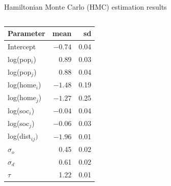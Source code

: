\documentclass{beamer}
\begin{document}
\begin{frame}{Hamiltonian Monte Carlo (HMC) estimation results}
		\begin{columns}
		\begin{column}{0.5\textwidth}
			\begin{center}
				\begin{small}
			  \begin{tabular}{lrr}
				\toprule
				Parameter & mean & sd \\ 
				\midrule
				Intercept      & $-0.74$ & 0.04 \\ 
				log(pop$_i$)   & 0.89 & 0.03  \\ 
				log(pop$_j$)   & 0.88 & 0.04  \\ 
				log(home$_i$)  & $-1.48$ & 0.19 \\ 
				log(home$_j$)  & $-1.27$ & 0.25  \\ 
				log(soc$_i$)   & $-0.04$ & 0.04  \\
				log(soc$_j$)   & $-0.06$ & 0.03 \\ 
				log(dist$_{ij})$ & $-1.96$ & 0.01  \\ 
				$\sigma_o$    & 0.45 & 0.02  \\ 
				$\sigma_d$    & 0.61 & 0.02  \\ 
				$\tau$        & 1.22 & 0.01  \\ 
				\bottomrule
			\end{tabular}
		\end{small}
		\end{center}
		\end{column}
		\begin{column}{0.5\textwidth} 


\end{column}
\end{columns}
\end{frame}
\end{document}
